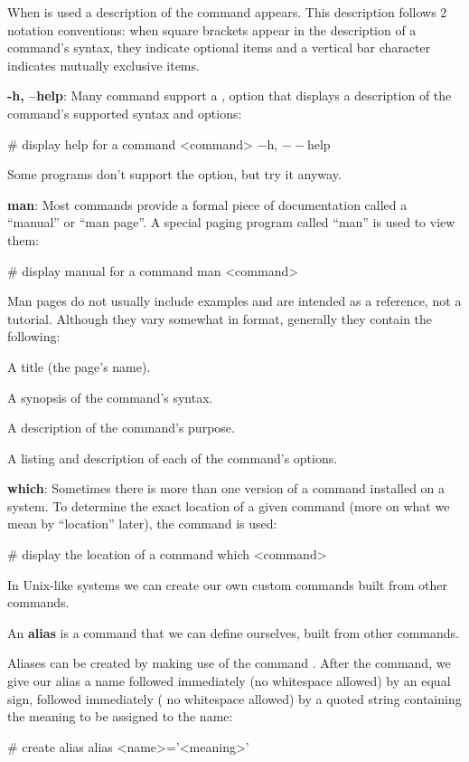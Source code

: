 When  is used a description of the command appears. This description follows 2 notation conventions: when
square brackets appear in the description of a command's syntax, they indicate optional items and a vertical bar
character indicates mutually exclusive items.

\item \textbf{-h, --help}: Many command support a ,  option that displays a description of the
command's supported syntax and options:
\begin{bash}
# display help for a command
<command> $-$h, $--$help
\end{bash}

Some programs don't support the option, but try it anyway.

\item \textbf{man}: Most commands provide a formal piece of documentation called a ``manual'' or ``man page''. A special
paging program called ``man'' is used to view them:
\begin{bash}
# display manual for a command
man <command>
\end{bash}

Man pages do not usually include examples and are intended as a reference, not a tutorial. Although they vary somewhat
in format, generally they contain the following:
\bit
\item A title (the page's name).
\item A synopsis of the command's syntax.
\item A description of the command's purpose.
\item A listing and description of each of the command's options.
\eit

\item \textbf{which}: Sometimes there is more than one version of a command installed on a system. To determine the
exact location of a given command (more on what we mean by ``location'' later), the  command is used:
\begin{bash}
# display the location of a command
which <command>
\end{bash}
\eit

In Unix-like systems we can create our own custom commands built from other commands.

\bd[Alias]
An \textbf{alias} is a command that we can define ourselves, built from other commands.
\ed

Aliases can be created by making use of the command . After the command, we give our alias a name followed
immediately (no whitespace allowed) by an equal sign, followed immediately (
no whitespace allowed) by a quoted string containing the meaning to be assigned to the name:
\begin{bash}
# create alias
alias <name>='<meaning>'
\end{bash}

